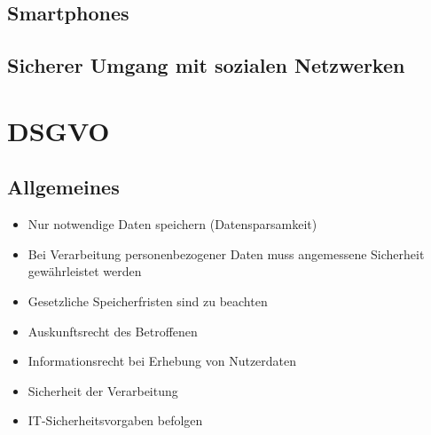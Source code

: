 
\subsection{Smartphones}


\subsection{Sicherer Umgang mit sozialen Netzwerken}


\section{DSGVO}

\subsection{Allgemeines}
\begin{frame}
\begin{itemize}
	\item Nur notwendige Daten speichern (Datensparsamkeit)
	\item Bei Verarbeitung personenbezogener Daten muss angemessene Sicherheit gewährleistet werden
	\item Gesetzliche Speicherfristen sind zu beachten
	\item Auskunftsrecht des Betroffenen
	\item Informationsrecht bei Erhebung von Nutzerdaten
	\item Sicherheit der Verarbeitung
	\item IT-Sicherheitsvorgaben befolgen
\end{itemize}
\end{frame}

